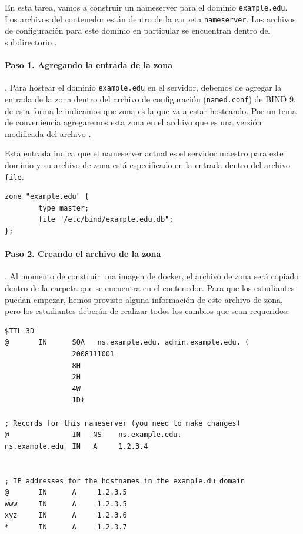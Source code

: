 En esta tarea, vamos a construir un nameserver para el dominio \texttt{example.edu}. Los archivos del contenedor están dentro de la carpeta \texttt{nameserver}. 
Los archivos de configuración para este dominio en particular se encuentran dentro del subdirectorio .

\paragraph{Paso 1. Agregando la entrada de la zona}. Para hostear el dominio \texttt{example.edu} en el servidor, debemos de agregar la entrada de la zona dentro del archivo de configuración (\texttt{named.conf}) de BIND 9, de esta forma le indicamos que zona es la que va a estar hosteando. Por un tema de conveniencia agregaremos esta zona en el archivo  que es una versión modificada del archivo .

Esta entrada indica que el nameserver actual es el servidor maestro para este dominio y su archivo de zona está especificado en la entrada dentro del archivo \texttt{file}.


\begin{lstlisting}
zone "example.edu" {
        type master;
        file "/etc/bind/example.edu.db";
};
\end{lstlisting}


\paragraph{Paso 2. Creando el archivo de la zona}. 
Al momento de construir una imagen de docker, el archivo de zona  será copiado dentro de la carpeta  que se encuentra en el contenedor.
Para que los estudiantes puedan empezar, hemos provisto alguna información de este archivo de zona, pero los estudiantes deberán de realizar todos los cambios que sean requeridos.

\begin{lstlisting}
$TTL 3D
@       IN      SOA   ns.example.edu. admin.example.edu. (
                2008111001
                8H
                2H
                4W
                1D)

; Records for this nameserver (you need to make changes)
@               IN   NS    ns.example.edu.
ns.example.edu  IN   A     1.2.3.4


; IP addresses for the hostnames in the example.du domain
@       IN      A     1.2.3.5
www     IN      A     1.2.3.5
xyz     IN      A     1.2.3.6
*       IN      A     1.2.3.7
\end{lstlisting}
 



